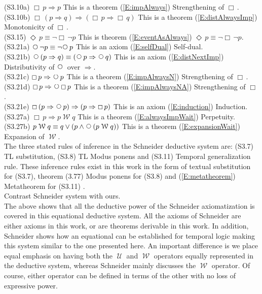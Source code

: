 \documentclass[12pt, fleqn, leqno]{article}
\newcommand{\impl}{\ensuremath{\Rightarrow}}        %
\newcommand{\Until}{\;\mathcal{U}\;}
\newcommand{\Wait}{\;\mathcal{W}\;}
\newcommand{\Next}{\;\,\text{\raisebox{3.5pt}{\circle{6}}}}
\newcommand{\Event}{\Diamond\,}
\newcommand{\Always}{\Box\,}
\begin{document}
(S3.10a) $\Always p \impl p$ This is a theorem (\ref{E:impAlways}) Strengthening of $\Always$.\\

(S3.10b) $\Always (p \impl q)  \impl ( \Always p \impl \Always q)$ This is a theorem
 (\ref{E:distAlwaysImp}) Monotonicity of $\Always$.\\
 
 (S3.15) $\Event p \equiv \neg \Always \neg p$   This is theorem (\ref{E:eventAsAlways}) $\Event p \equiv \neg \Always \neg p$. \\

(S3.21a) $\Next \neg p \equiv \neg \Next p$ This is an axiom (\ref{E:selfDual}) Self-dual.\\

(S3.21b) $\Next (p \impl q)  \equiv ( \Next p \impl \Next q)$ 
This is an axiom (\ref{E:distNextImp}) Distributivity of $\Next$ over $\impl$.\\

(S3.21c) $\Always p \impl  \Next p$ This is a theorem (\ref{E:impAlwaysN}) Strengthening of $\Always$.\\

(S3.21d) $\Always p \impl  \Next \Always p$ This is a theorem (\ref{E:impAlwaysNA}) Strengthening of $\Always$.\\

(S3.21e) $\Always  (p \impl \Next p)  \impl   (p \impl \Always p)$ This is an axiom (\ref{E:induction}) Induction.\\

(S3.27a) $\Always p \impl p \Wait q$ This is a theorem (\ref{E:alwaysImpWait}) Perpetuity.\\

(S3.27b) $p \Wait q \equiv q \lor (p \land \Next (p \Wait q))$ This is a theorem (\ref{E:expansionWait}) Expansion of $\Wait$.\\

The three stated rules of inference in the Schneider deductive system are: (S3.7) TL substitution,
(S3.8) TL Modus ponens and (S3.11) Temporal generalization rule.
These inference rules exist in this work in the form of textual 
substitution for (S3.7), theorem (3.77) Modus ponens for (S3.8) and (\ref{E:metatheorem}) Metatheorem for (S3.11) .\\

Contrast Schneider system with ours.\\

The above shows that all the deductive power of the Schneider axiomatization is covered in this equational deductive system. All the axioms of Schneider are either axioms in this work, or are theorems derivable in this work.
In addition, Schneider shows how an equational can be established for temporal logic making this
system similar to the one presented here.
An important difference is we place equal emphasis on having both the $\Until$ and $\Wait$
operators equally represented in the deductive system, whereas Schneider mainly discusses the $\Wait$ operator.
Of course, either operator can be defined in terms of the other with no loss of expressive power.\\
\end{document}
